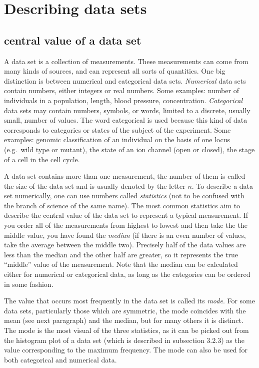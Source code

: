 \documentclass[
  letterpaper,
  DIV=11,
  numbers=noendperiod]{scrreprt}
\begin{document}
\hypertarget{describing-data-sets-1}{%
\section{Describing data sets}\label{describing-data-sets-1}}

\label{sec:math3}

\hypertarget{central-value-of-a-data-set}{%
\subsection{central value of a data
set}\label{central-value-of-a-data-set}}

A data set is a collection of measurements. These measurements can come
from many kinds of sources, and can represent all sorts of quantities.
One big distinction is between numerical and categorical data sets.
\emph{Numerical}  data sets contain numbers,
either integers or real numbers. Some examples: number of individuals in
a population, length, blood pressure, concentration. \emph{Categorical}
 data sets may contain numbers, symbols, or
words, limited to a discrete, usually small, number of values. The word
categorical is used because this kind of data corresponds to categories
or states of the subject of the experiment. Some examples: genomic
classification of an individual on the basis of one locus (e.g.~wild
type or mutant), the state of an ion channel (open or closed), the stage
of a cell in the cell cycle.

A data set contains more than one measurement, the number of them is
called the size of the data set and is usually denoted by the letter
\(n\). To describe a data set numerically, one can use numbers called
\emph{statistics} (not to be confused with the branch of science of the
same name). The most common statistics aim to describe the central value
of the data set to represent a typical measurement. If you order all of
the measurements from highest to lowest and then take the the middle
value, you have found the  \emph{median} (if there is an
even number of values, take the average between the middle two).
Precisely half of the data values are less than the median and the other
half are greater, so it represents the true ``middle'' value of the
measurement. Note that the median can be calculated either for numerical
or categorical data, as long as the categories can be ordered in some
fashion.

The value that occurs most frequently in the data set is called its
\emph{mode}. For some data sets, particularly those which
are symmetric, the mode coincides with the mean (see next paragraph) and
the median, but for many others it is distinct. The mode is the most
visual of the three statistics, as it can be picked out from the
histogram plot of a data set (which is described in subsection 3.2.3) as
the value corresponding to the maximum frequency. The mode can also be
used for both categorical and numerical data.
\end{document}
